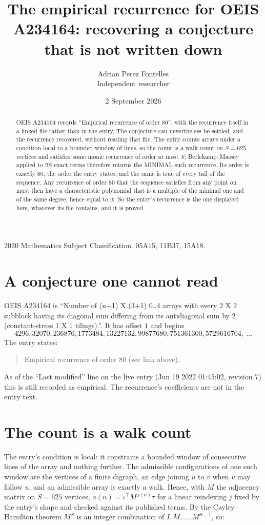 \documentclass[11pt,a4paper]{article}
\title{The empirical recurrence for OEIS A234164: recovering a conjecture that is not written down}
\author{Adrian Perez Fontelles\\ \small Independent researcher}
\date{2 September 2026}
\theoremstyle{plain}
\theoremstyle{definition}
\begin{document}
\maketitle

\begin{abstract}
OEIS A234164 records ``Empirical recurrence of order $80$'', with the recurrence itself in a
linked file rather than in the entry. The conjecture can nevertheless be settled, and the
recurrence recovered, without reading that file. The entry counts arrays under a condition
local to a bounded window of lines, so the count is a walk count on $S=625$ vertices and
satisfies some monic recurrence of order at most $S$; Berlekamp--Massey applied to $2S$ exact
terms therefore returns the MINIMAL such recurrence. Its order is exactly $80$, the order
the entry states, and the same is true of every tail of the sequence. Any recurrence of order
$80$ that the sequence satisfies from any point on must then have a characteristic
polynomial that is a multiple of the minimal one and of the same degree, hence equal to it. So
the entry's recurrence is the one displayed here, whatever its file contains, and it is
proved.
\end{abstract}

\noindent\small 2020 Mathematics Subject Classification. 05A15, 11B37, 15A18.\normalsize

\section{A conjecture one cannot read}

OEIS A234164 is ``Number of (n+1) X (3+1) 0..4 arrays with every 2 X 2 subblock having its diagonal sum differing from its antidiagonal sum by 2 (constant-stress 1 X 1 tilings).''. It has offset $1$ and begins
\[
4296, 32070, 236876, 1773484, 13227132, 99877680, 751361300, 5729616704,\ \dots
\]
The entry states:
\begin{quote}
Empirical recurrence of order 80 (see link above).
\end{quote}
As of the ``Last modified'' line on the live entry (Jun 19 2022 01:45:02, revision 7) this is still
recorded as empirical. The recurrence's coefficients are not in the entry text.

\section{The count is a walk count}

The entry's condition is local: it constrains a bounded window of consecutive lines of the
array and nothing further. The admissible configurations of one such window are the vertices
of a finite digraph, an edge joining $u$ to $v$ when $v$ may follow $u$, and an admissible
array is exactly a walk. Hence, with $M$ the adjacency matrix on $S=625$ vertices,
$a(n)=\iota^{\!\top}M^{\,j(n)}\tau$ for a linear reindexing $j$ fixed by the entry's shape
and checked against its published terms. By the Cayley--Hamilton theorem $M^{S}$ is an
integer combination of $I,M,\dots,M^{S-1}$, so:
\end{document}
